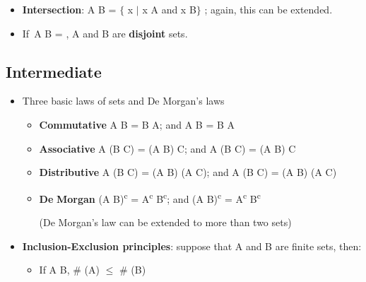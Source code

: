 \documentclass[12pt]{report}
\renewcommand{\_}{\kern-1.5pt\textunderscore\kern-1.5pt}
\begin{document}
\begin{itemize}
	\item \textbf{Intersection}: A  B = $ \{ $ x $ \vert $  x  A and x  B$ \} $ ; again, this can be extended.\par

	\item If\  A  B = , A and B are \textbf{disjoint} sets. \ \ \  \par


\end{itemize}\subsection*{Intermediate}
\begin{itemize}
	\item Three basic laws of sets and De Morgan’s laws\par

\begin{itemize}
	\item \textbf{Commutative} \tab A  B = B  A; \tab \tab \tab \tab and A  B = B  A\par

	\item \textbf{Associative} \tab A  (B  C) = (A  B)  C; \tab \tab and A  (B  C) = (A  B)  C\par

	\item \textbf{Distributive} \tab A  (B  C) = (A  B)  (A  C); \tab and A  (B  C) = (A  B)  (A  C)\par

	\item \textbf{De} \textbf{Morgan} \tab (A  B)\textsuperscript{c} = A\textsuperscript{c}  B\textsuperscript{c}; \tab \tab \tab and (A  B)\textsuperscript{c} = A\textsuperscript{c}  B\textsuperscript{c}\par

(De Morgan’s law can be extended to more than two sets)\par


\end{itemize}
	\item \textbf{Inclusion-Exclusion principles}: suppose that A and B are finite sets, then:\par

\begin{itemize}
	\item If A  B, $\#$ (A) $ \leq $  $\#$ (B)\par


\end{itemize}
\end{itemize}
\end{document}
